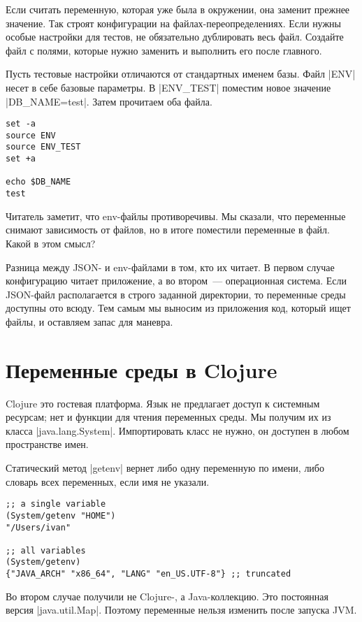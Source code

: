Если считать переменную, которая уже была в окружении, она заменит прежнее
значение. Так строят конфигурации на файлах-переопределениях. Если нужны особые
настройки для тестов, не обязательно дублировать весь файл. Создайте файл с
полями, которые нужно заменить и выполнить его после главного.

Пусть тестовые настройки отличаются от стандартных именем базы. Файл
\spverb|ENV| несет в себе базовые параметры. В \spverb|ENV_TEST| поместим новое
значение \spverb|DB_NAME=test|. Затем прочитаем оба файла.

\begin{verbatim}
set -a
source ENV
source ENV_TEST
set +a

echo $DB_NAME
test
\end{verbatim}

Читатель заметит, что env-файлы противоречивы. Мы сказали, что переменные
снимают зависимость от файлов, но в итоге поместили переменные в файл. Какой в
этом смысл?

Разница между JSON- и env-файлами в том, кто их читает. В первом случае
конфигурацию читает приложение, а во втором~--- операционная система. Если
JSON-файл располагается в строго заданной директории, то переменные среды
доступны ото всюду. Тем самым мы выносим из приложения код, который ищет файлы,
и оставляем запас для маневра.

\section{Переменные среды в Clojure}

Clojure это гостевая платформа. Язык не предлагает доступ к системным ресурсам;
нет и функции для чтения переменных среды. Мы получим их из класса
\spverb|java.lang.System|. Импортировать класс не нужно, он доступен в любом
пространстве имен.

Статический метод \spverb|getenv| вернет либо одну переменную по имени, либо
словарь всех переменных, если имя не указали.

\begin{verbatim}
;; a single variable
(System/getenv "HOME")
"/Users/ivan"

;; all variables
(System/getenv)
{"JAVA_ARCH" "x86_64", "LANG" "en_US.UTF-8"} ;; truncated
\end{verbatim}

Во втором случае получили не Clojure-, а Java-коллекцию. Это постоянная версия
\spverb|java.util.Map|. Поэтому переменные нельзя изменить после запуска JVM.

